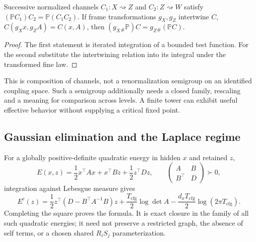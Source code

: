 \begin{proposition}\label{thm:rg_semigroup}\label{thm:rg_covariance}
Successive normalized channels $C_1:X\rightsquigarrow Z$ and $C_2:Z\rightsquigarrow W$ satisfy
$(\mathbb P C_1)C_2=\mathbb P(C_1C_2)$.
If frame transformations $g_X,g_Z$ intertwine $C$,
$C(g_Xx,g_ZA)=C(x,A)$, then
$(g_X{}_\#\mathbb P)C=g_Z{}_\#(\mathbb PC)$.
\end{proposition}
\begin{proof}
The first statement is iterated integration of a bounded test function. For the second substitute the intertwining relation into its integral under the transformed fine law.
\end{proof}
This is composition of channels, not a renormalization semigroup on an identified coupling space. Such a semigroup additionally needs a closed family, rescaling and a meaning for comparison across levels. A finite tower can exhibit useful effective behavior without supplying a critical fixed point.

\subsection{Gaussian elimination and the Laplace regime}
For a globally positive-definite quadratic energy in hidden $x$ and retained $z$,
\begin{equation}
E(x,z)=\frac12x^\top Ax+x^\top Bz+\frac12z^\top Dz,
\qquad
\begin{pmatrix}A&B\\B^\top&D\end{pmatrix}\succ0,
\end{equation}
integration against Lebesgue measure gives
\begin{equation}
E^c(z)=\frac12z^\top(D-B^\top A^{-1}B)z
+\frac{T_{\mathrm{cfg}}}{2}\log\det A
-\frac{d_xT_{\mathrm{cfg}}}{2}\log(2\pi T_{\mathrm{cfg}}).
\label{eq:rg_reduced_hessian}
\end{equation}
Completing the square proves the formula. It is exact closure in the family of all such quadratic energies; it need not preserve a restricted graph, the absence of self terms, or a chosen shared $R_iS_j$ parameterization.

